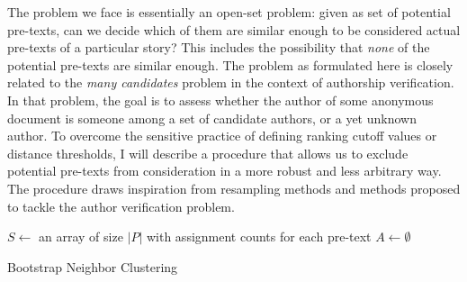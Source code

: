 The problem we face is essentially an open-set problem: given as set of potential pre-texts, can we decide which of them are similar enough to be considered actual pre-texts of a particular story? This includes the possibility that \emph{none} of the potential pre-texts are similar enough. The problem as formulated here is closely related to the \emph{many candidates} problem in the context of authorship verification\autocite{koppel:2014}. In that problem, the goal is to assess whether the author of some anonymous document is someone among a set of candidate authors, or a yet unknown author\autocite{koppel:2014}. To overcome the sensitive practice of defining ranking cutoff values or distance thresholds, I will describe a procedure that allows us to exclude potential pre-texts from consideration in a more robust and less arbitrary way. The procedure draws inspiration from resampling methods\autocite{good:2006} and methods proposed to tackle the author verification problem\autocite{koppel:2014}.

\begin{algorithm}[t]
$S \leftarrow $ an array of size $|P|$ with assignment counts for each pre-text\;
$A \leftarrow \emptyset$\;
 \caption{Bootstrap Neighbor Clustering}
 \label{alg:boostrap-clustering}
\end{algorithm}

